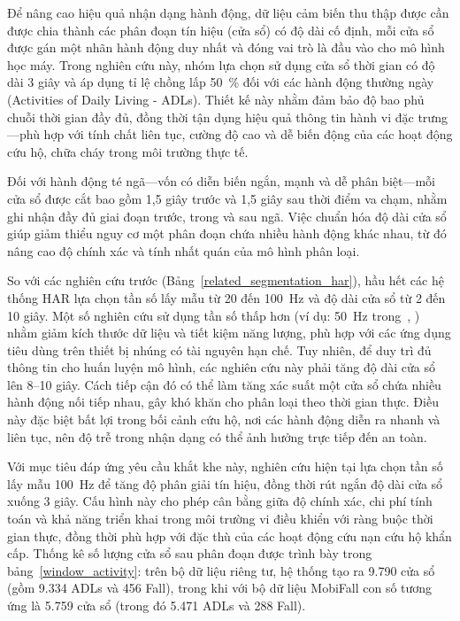Để nâng cao hiệu quả nhận dạng hành động, dữ liệu cảm biến thu thập được cần được chia thành các phân đoạn tín hiệu (cửa sổ) có độ dài cố định, mỗi cửa sổ được gán một nhãn hành động duy nhất và đóng vai trò là đầu vào cho mô hình học máy. Trong nghiên cứu này, nhóm lựa chọn sử dụng cửa sổ thời gian có độ dài 3 giây và áp dụng tỉ lệ chồng lấp 50~\% đối với các hành động thường ngày (Activities of Daily Living - ADLs). Thiết kế này nhằm đảm bảo độ bao phủ chuỗi thời gian đầy đủ, đồng thời tận dụng hiệu quả thông tin hành vi đặc trưng—phù hợp với tính chất liên tục, cường độ cao và dễ biến động của các hoạt động cứu hộ, chữa cháy trong môi trường thực tế.

Đối với hành động té ngã—vốn có diễn biến ngắn, mạnh và dễ phân biệt—mỗi cửa sổ được cắt bao gồm 1,5 giây trước và 1,5 giây sau thời điểm va chạm, nhằm ghi nhận đầy đủ giai đoạn trước, trong và sau ngã. Việc chuẩn hóa độ dài cửa sổ giúp giảm thiểu nguy cơ một phân đoạn chứa nhiều hành động khác nhau, từ đó nâng cao độ chính xác và tính nhất quán của mô hình phân loại.

So với các nghiên cứu trước (Bảng~\ref{related_segmentation_har}), hầu hết các hệ thống HAR lựa chọn tần số lấy mẫu từ 20 đến 100~Hz và độ dài cửa sổ từ 2 đến 10 giây. Một số nghiên cứu sử dụng tần số thấp hơn (ví dụ: 50~Hz trong~\cite{vi2024efficient}, \cite{hong2023low}) nhằm giảm kích thước dữ liệu và tiết kiệm năng lượng, phù hợp với các ứng dụng tiêu dùng trên thiết bị nhúng có tài nguyên hạn chế. Tuy nhiên, để duy trì đủ thông tin cho huấn luyện mô hình, các nghiên cứu này phải tăng độ dài cửa sổ lên 8–10 giây. Cách tiếp cận đó có thể làm tăng xác suất một cửa sổ chứa nhiều hành động nối tiếp nhau, gây khó khăn cho phân loại theo thời gian thực. Điều này đặc biệt bất lợi trong bối cảnh cứu hộ, nơi các hành động diễn ra nhanh và liên tục, nên độ trễ trong nhận dạng có thể ảnh hưởng trực tiếp đến an toàn.

Với mục tiêu đáp ứng yêu cầu khắt khe này, nghiên cứu hiện tại lựa chọn tần số lấy mẫu 100~Hz để tăng độ phân giải tín hiệu, đồng thời rút ngắn độ dài cửa sổ xuống 3 giây. Cấu hình này cho phép cân bằng giữa độ chính xác, chi phí tính toán và khả năng triển khai trong môi trường vi điều khiển với ràng buộc thời gian thực, đồng thời phù hợp với đặc thù của các hoạt động cứu nạn cứu hộ khẩn cấp. Thống kê số lượng cửa sổ sau phân đoạn được trình bày trong bảng~\ref{window_activity}: trên bộ dữ liệu riêng tư, hệ thống tạo ra 9.790 cửa sổ (gồm 9.334 ADLs và 456 Fall), trong khi với bộ dữ liệu MobiFall con số tương ứng là 5.759 cửa sổ (trong đó 5.471 ADLs và 288 Fall).

